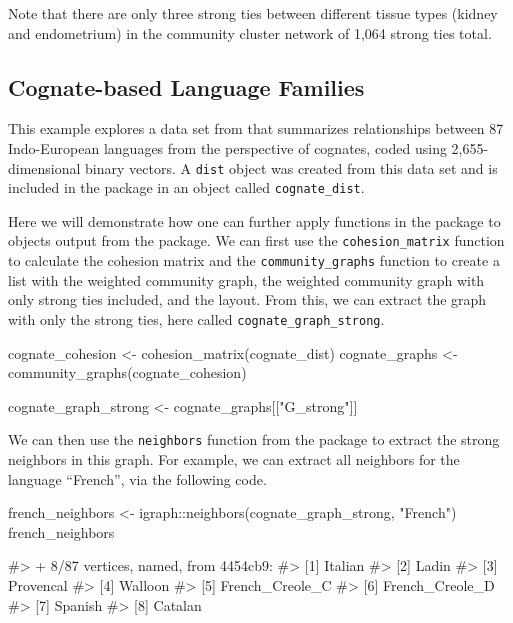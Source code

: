 Note that there are only three strong ties between different tissue
types (kidney and endometrium) in the community cluster network of 1,064
strong ties total.

\hypertarget{cognate-based-language-families}{%
\subsection{Cognate-based Language
Families}\label{cognate-based-language-families}}

This example explores a data set from \citet{dyen92} that summarizes
relationships between 87 Indo-European languages from the perspective of
cognates, coded using 2,655-dimensional binary vectors. A \texttt{dist}
object was created from this data set and is included in the
 package in an object called \texttt{cognate\_dist}.

Here we will demonstrate how one can further apply functions in the
 package to objects output from the 
package. We can first use the \texttt{cohesion\_matrix} function to
calculate the cohesion matrix and the \texttt{community\_graphs}
function to create a list with the weighted community graph, the
weighted community graph with only strong ties included, and the layout.
From this, we can extract the graph with only the strong ties, here
called \texttt{cognate\_graph\_strong}.

\begin{Schunk}
\begin{Sinput}
cognate_cohesion <- cohesion_matrix(cognate_dist)
cognate_graphs <- community_graphs(cognate_cohesion)

cognate_graph_strong <- cognate_graphs[["G_strong"]]
\end{Sinput}
\end{Schunk}

We can then use the \texttt{neighbors} function from the
 package to extract the strong neighbors in this graph.
For example, we can extract all neighbors for the language ``French'',
via the following code.

\begin{Schunk}
\begin{Sinput}
french_neighbors <- igraph::neighbors(cognate_graph_strong, "French")
french_neighbors
\end{Sinput}
\begin{Soutput}
#> + 8/87 vertices, named, from 4454cb9:
#> [1] Italian        
#> [2] Ladin          
#> [3] Provencal      
#> [4] Walloon        
#> [5] French_Creole_C
#> [6] French_Creole_D
#> [7] Spanish        
#> [8] Catalan
\end{Soutput}
\end{Schunk}

